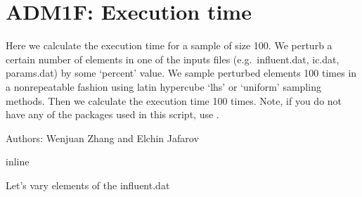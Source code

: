 \documentclass[a4paper,10pt,english]{sphinxmanual}
\begin{document}
\section{ADM1F: Execution time}
\label{\detokenize{jupyter_notebook/execution_time:ADM1F:-Execution-time}}\label{\detokenize{jupyter_notebook/execution_time::doc}}
\sphinxAtStartPar
Here we calculate the execution time for a sample of size 100. We perturb a certain number of elements in one of the inputs files (e.g. influent.dat, ic.dat, params.dat) by some ‘percent’ value. We sample perturbed elements 100 times in a non\sphinxhyphen{}repeatable fashion using latin hypercube ‘lhs’ or ‘uniform’ sampling methods. Then we calculate the execution time 100 times. Note, if you do not have any of the packages used in this script, use .

\sphinxAtStartPar
Authors: Wenjuan Zhang and Elchin Jafarov

{
\begin{sphinxVerbatim}[commandchars=\\\{\}]
\llap{\color{nbsphinxin}[1]:\,\hspace{\fboxrule}\hspace{\fboxsep}}   
 
   
 inline
\end{sphinxVerbatim}
}

{
\begin{sphinxVerbatim}[commandchars=\\\{\}]
\llap{\color{nbsphinxin}[2]:\,\hspace{\fboxrule}\hspace{\fboxsep}}
\end{sphinxVerbatim}
}

\sphinxAtStartPar
{} Let’s vary elements of the influent.dat
\end{document}
